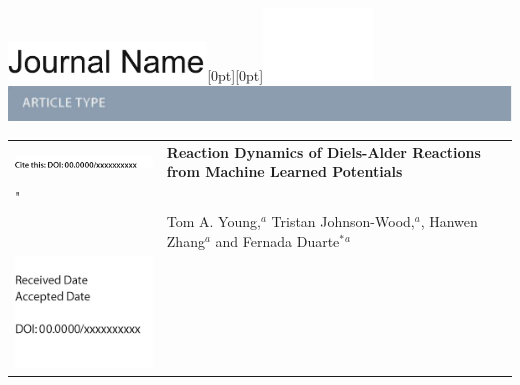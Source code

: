 \documentclass[twoside,twocolumn,9pt]{article}
\begin{document}
  \begin{@twocolumnfalse}
{\includegraphics[height=30pt]{head_foot/journal_name}\hfill\raisebox{0pt}[0pt][0pt]{\includegraphics[height=55pt]{head_foot/RSC_LOGO_CMYK}}\\[1ex]
\includegraphics[width=18.5cm]{head_foot/header_bar}}\par
\vspace{1em}
\sffamily
\begin{tabular}{m{4.5cm} p{13.5cm} }

\includegraphics{head_foot/DOI} & \noindent\LARGE{\textbf{Reaction Dynamics of Diels-Alder Reactions from Machine Learned Potentials}} \\%
"
 & \vspace{0.3cm} \\

 & \noindent\large{Tom A. Young,\textit{$^{a}$} Tristan Johnson-Wood,\textit{$^{a}$}, Hanwen Zhang\textit{$^{a}$} and Fernada Duarte$^\ast$\textit{$^{a}$}} \\%

\includegraphics{head_foot/dates} & \\

\end{tabular}

 \end{@twocolumnfalse} \vspace{0.6cm}
\end{document}
